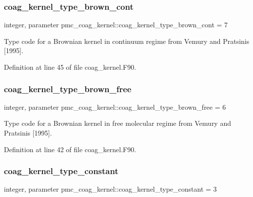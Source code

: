 \subsubsection{\texorpdfstring{coag\+\_\+kernel\+\_\+type\+\_\+brown\+\_\+cont}{coag\_kernel\_type\_brown\_cont}}
{\footnotesize\ttfamily integer, parameter pmc\+\_\+coag\+\_\+kernel\+::coag\+\_\+kernel\+\_\+type\+\_\+brown\+\_\+cont = 7}



Type code for a Brownian kernel in continuum regime from Vemury and Pratsinis \mbox{[}1995\mbox{]}. 



Definition at line 45 of file coag\+\_\+kernel.\+F90.

\mbox{\label{namespacepmc__coag__kernel_ac11bbcea41051f4b2e16769f2a78fc94}} 
\subsubsection{\texorpdfstring{coag\+\_\+kernel\+\_\+type\+\_\+brown\+\_\+free}{coag\_kernel\_type\_brown\_free}}
{\footnotesize\ttfamily integer, parameter pmc\+\_\+coag\+\_\+kernel\+::coag\+\_\+kernel\+\_\+type\+\_\+brown\+\_\+free = 6}



Type code for a Brownian kernel in free molecular regime from Vemury and Pratsinis \mbox{[}1995\mbox{]}. 



Definition at line 42 of file coag\+\_\+kernel.\+F90.

\mbox{\label{namespacepmc__coag__kernel_a6706cc1fc48d83cd5fbca4bba57d60b2}} 
\subsubsection{\texorpdfstring{coag\+\_\+kernel\+\_\+type\+\_\+constant}{coag\_kernel\_type\_constant}}
{\footnotesize\ttfamily integer, parameter pmc\+\_\+coag\+\_\+kernel\+::coag\+\_\+kernel\+\_\+type\+\_\+constant = 3}



